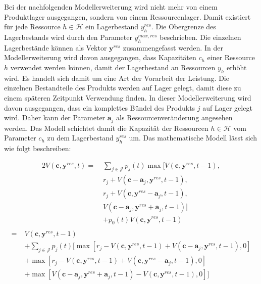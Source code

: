 Bei der nachfolgenden Modellerweiterung wird nicht mehr von einem Produktlager ausgegangen, sondern von einem Ressourcenlager. Damit existiert für jede Ressource $h\in\mathcal{H}$ ein Lagerbestand $y_h^{res}$. Die Obergrenze des Lagerbestands wird durch den Parameter $y_{h}^{max,res}$ beschrieben. Die einzelnen Lagerbestände können als Vektor $\textbf{y}^{res}$ zusammengefasst werden. In der Modellerweiterung wird davon ausgegangen, dass Kapazitäten $c_{h}$ einer Ressource $h$ verwendet werden können, damit der Lagerbestand an Ressourcen $y_{h}$ erhöht wird. Es handelt sich damit um eine Art der Vorarbeit der Leistung. Die einzelnen Bestandteile des Produkts werden auf Lager gelegt, damit diese zu einem späteren Zeitpunkt Verwendung finden. In dieser Modellerweiterung wird davon ausgegangen, dass ein komplettes Bündel des Produkts $j$ auf Lager gelegt wird. Daher kann der Parameter $\textbf{a}_{j}$ als Ressourcenveränderung angesehen werden. Das Modell schichtet damit die Kapazität der Ressourcen $h\in\mathcal{H}$ vom Parameter $c_{h}$ zu dem Lagerbestand $y_{h}^{res}$ um. Das mathematische Modell lässt sich wie folgt beschreiben:

\begin{alignat*}{2}
V(\textbf{c}, \textbf{y}^{res}, t) =\;& \sum_{j \in \mathcal{J}}p_{j}(t)\max[V(\textbf{c}, \textbf{y}^{res}, t-1),\\
&r_{j} + V(\textbf{c}-\textbf{a}_j, \textbf{y}^{res}, t-1),\\
&r_{j} + V(\textbf{c}, \textbf{y}^{res}-\textbf{a}_j, t-1),\\
&V(\textbf{c}-\textbf{a}_j, \textbf{y}^{res}+\textbf{a}_j, t-1)]\\
&+ p_{0}(t)V(\textbf{c}, \textbf{y}^{res}, t-1) \\
\end{alignat*}
\begin{equation}\label{workup}
\begin{alignat*}{2}
= \;& V(\textbf{c}, \textbf{y}^{res}, t-1)\\
&+ \sum_{j \in \mathcal{J}}p_{j}(t)[\max[r_{j} - V(\textbf{c}, \textbf{y}^{res}, t-1) + V(\textbf{c}-\textbf{a}_j, \textbf{y}^{res}, t-1),0] \\
&+ \max[r_{j} - V(\textbf{c}, \textbf{y}^{res}, t-1) + V(\textbf{c}, \textbf{y}^{res}-\textbf{a}_j, t-1),0]\\
&+ \max[V(\textbf{c}-\textbf{a}_j, \textbf{y}^{res}+\textbf{a}_j, t-1) - V(\textbf{c}, \textbf{y}^{res}, t-1) ,0]]\\
\end{alignat*}
\end{equation}

